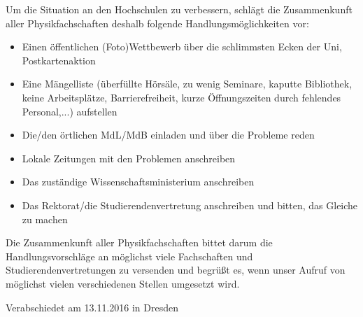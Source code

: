 \documentclass[DIV=calc]{scrartcl}
\begin{document}
Um die Situation an den Hochschulen zu verbessern, schlägt die Zusammenkunft aller Physikfachschaften deshalb folgende Handlungsmöglichkeiten vor: 
\begin{itemize}
\item Einen öffentlichen (Foto)Wettbewerb über die schlimmsten Ecken der Uni, Postkartenaktion 
\item Eine Mängelliste (überfüllte Hörsäle, zu wenig Seminare, kaputte Bibliothek, keine Arbeitsplätze, Barrierefreiheit, kurze Öffnungszeiten durch fehlendes Personal,...) aufstellen 
\item Die/den örtlichen MdL/MdB einladen und über die Probleme reden 
\item Lokale Zeitungen mit den Problemen anschreiben 
\item Das zuständige Wissenschaftsministerium anschreiben 
\item Das Rektorat/die Studierendenvertretung anschreiben und bitten, das Gleiche zu machen 
\end{itemize}
Die Zusammenkunft aller Physikfachschaften bittet darum die Handlungsvorschläge an möglichst viele Fachschaften und Studierendenvertretungen zu versenden und begrüßt es, wenn unser Aufruf von möglichst vielen verschiedenen Stellen umgesetzt wird. 

\vfill
\begin{flushright}
Verabschiedet am 13.11.2016 in Dresden
\end{flushright}
\end{document}

